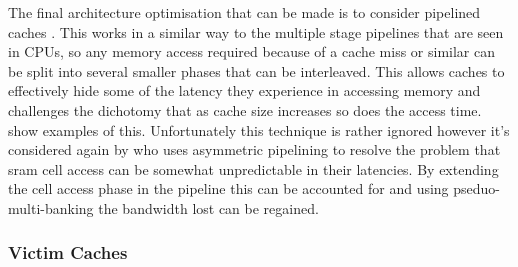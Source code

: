 The final architecture optimisation that can be made is to consider pipelined caches \cite{olukotunMultilevelOptimizationPipelined1997, olukotunPerformanceOptimizationPipelined1992}. This works in a similar way to the multiple stage pipelines that are seen in CPUs, so any memory access required because of a cache miss or similar can be split into several smaller phases that can be interleaved. This allows caches to effectively hide some of the latency they experience in accessing memory and challenges the dichotomy that as cache size increases so does the access time. \citet{srivastava190MHzCMOS4Kbyte1995, agarwalExploringHighBandwidth2003, martinDesignAsynchronousMIPS1997} show examples of this. Unfortunately this technique is rather ignored however it's considered again by \citet{hongAVICAAccesstimeVariation2013} who uses asymmetric pipelining to resolve the problem that \gls{sram} cell access can be somewhat unpredictable in their latencies. By extending the cell access phase in the pipeline this can be accounted for and using pseduo-multi-banking the bandwidth lost can be regained.

\subsubsection{Victim Caches}

